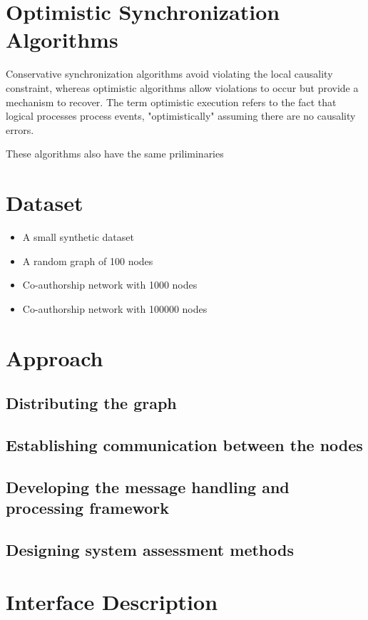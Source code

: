 \documentclass[12pt,a4paper]{article}
\begin{document}
	\section{Optimistic Synchronization Algorithms}
	
	Conservative synchronization algorithms avoid violating the local causality constraint, whereas optimistic algorithms allow violations to occur but provide a mechanism to recover. The term optimistic execution refers to the fact that logical processes process events, "optimistically" assuming there are no causality errors.
	
	These algorithms also have the same priliminaries
\section{Dataset}
	\begin{itemize}[nolistsep]
		\item A small synthetic dataset
		\item A random graph of 100 nodes
		\item Co-authorship network with 1000 nodes
		\item Co-authorship network with 100000 nodes
	\end{itemize}

\section{Approach}
	\subsection{Distributing the graph}
	\subsection{Establishing communication between the nodes}
	\subsection{Developing the message handling and processing framework}
	\subsection{Designing system assessment methods}
\section{Interface Description}
	 
\end{document}
